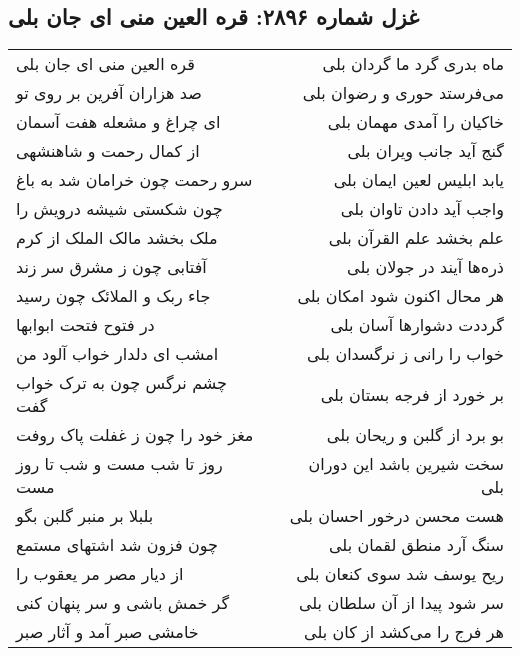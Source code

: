 \begin{center}
\section*{غزل شماره ۲۸۹۶: قره العین منی ای جان بلی}
\label{sec:2896}
\begin{longtable}{l p{0.5cm} r}
قره العین منی ای جان بلی
&&
ماه بدری گرد ما گردان بلی
\\
صد هزاران آفرین بر روی تو
&&
می‌فرستد حوری و رضوان بلی
\\
ای چراغ و مشعله هفت آسمان
&&
خاکیان را آمدی مهمان بلی
\\
از کمال رحمت و شاهنشهی
&&
گنج آید جانب ویران بلی
\\
سرو رحمت چون خرامان شد به باغ
&&
یابد ابلیس لعین ایمان بلی
\\
چون شکستی شیشه درویش را
&&
واجب آید دادن تاوان بلی
\\
ملک بخشد مالک الملک از کرم
&&
علم بخشد علم القرآن بلی
\\
آفتابی چون ز مشرق سر زند
&&
ذره‌ها آیند در جولان بلی
\\
جاء ربک و الملائک چون رسید
&&
هر محال اکنون شود امکان بلی
\\
در فتوح فتحت ابوابها
&&
گرددت دشوارها آسان بلی
\\
امشب ای دلدار خواب آلود من
&&
خواب را رانی ز نرگسدان بلی
\\
چشم نرگس چون به ترک خواب گفت
&&
بر خورد از فرجه بستان بلی
\\
مغز خود را چون ز غفلت پاک روفت
&&
بو برد از گلبن و ریحان بلی
\\
روز تا شب مست و شب تا روز مست
&&
سخت شیرین باشد این دوران بلی
\\
بلبلا بر منبر گلبن بگو
&&
هست محسن درخور احسان بلی
\\
چون فزون شد اشتهای مستمع
&&
سنگ آرد منطق لقمان بلی
\\
از دیار مصر مر یعقوب را
&&
ریح یوسف شد سوی کنعان بلی
\\
گر خمش باشی و سر پنهان کنی
&&
سر شود پیدا از آن سلطان بلی
\\
خامشی صبر آمد و آثار صبر
&&
هر فرج را می‌کشد از کان بلی
\\
\end{longtable}
\end{center}
